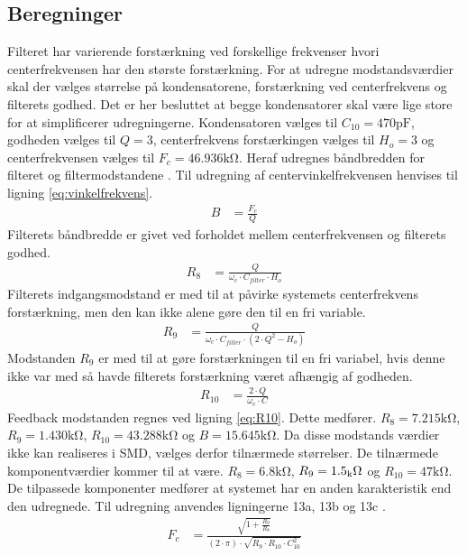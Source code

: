 \subsection{Beregninger}
Filteret har varierende forstærkning ved forskellige frekvenser hvori centerfrekvensen har den største forstærkning. For at udregne modstandsværdier skal der vælges størrelse på kondensatorene, forstærkning ved centerfrekvens og filterets godhed.
Det er her besluttet at begge kondensatorer skal være lige store for at simplificerer udregningerne.
Kondensatoren vælges til $C_{10} = 470 \si{\pico\farad}$, godheden vælges til $Q = 3$, centerfrekvens forstærkingen vælges til $H_o = 3$ og centerfrekvensen vælges til $F_c = 46.936 \si{\kilo\ohm}$.
Heraf udregnes båndbredden for filteret og filtermodstandene \cite[Side. 209]{Huelsman1993}.
Til udregning af centervinkelfrekvensen henvises til ligning \ref{eq:vinkelfrekvens}.
\begin{align}
	B & = \frac{F_c}{Q}
	\end{align}
Filterets båndbredde er givet ved forholdet mellem centerfrekvensen og filterets godhed.
\begin{align}
	R_8 & = \frac{Q}{\omega_c \cdot C_{filter} \cdot H_o } \label{eq:R8}
	\end{align}
Filterets indgangsmodstand er med til at påvirke systemets centerfrekvens forstærkning, men den kan ikke alene gøre den til en fri variable. 
\begin{align}
	R_9 & = \frac{Q}{ \omega_c \cdot C_{filter} \cdot \left( 2 \cdot Q^2 - H_o \right) } \label{eq:R9}
	\end{align}
Modstanden $R_9$ er med til at gøre forstærkningen til en fri variabel, hvis denne ikke var med så havde filterets forstærkning været afhængig af godheden.
\begin{align}
	R_{10} & = \frac{2 \cdot Q}{ \omega_c \cdot C} \label{eq:R10}
\end{align}
Feedback modstanden regnes ved ligning \ref{eq:R10}.
Dette medfører. $R_8 = 7.215 \si{\kilo\ohm}$, $R_9 = 1.430 \si{\kilo\ohm}$, $R_{10} = 43.288 \si{\kilo\ohm}$ og $B = 15.645 \si{\kilo\ohm}$.
Da disse modstands værdier ikke kan realiseres i SMD, vælges derfor tilnærmede størrelser.
De tilnærmede komponentværdier kommer til at være. $R_8 = 6.8 \si{\kilo\ohm}$, $R_9 = 1.5 \si{_\kilo\ohm}$ og $R_{10} = 47 \si{\kilo\ohm}$.
De tilpassede komponenter medfører at systemet har en anden karakteristik end den udregnede. 
Til udregning anvendes ligningerne 13a, 13b og 13c \cite[Side. 208]{Huelsman1993}. 
\begin{align}
	F_c & = \frac{\sqrt{1+\frac{R_9}{R_8}}}{\left( 2 \cdot \pi \right) \cdot \sqrt{R_9 \cdot R_{10} \cdot C_{10}^2}}
	\end{align}
